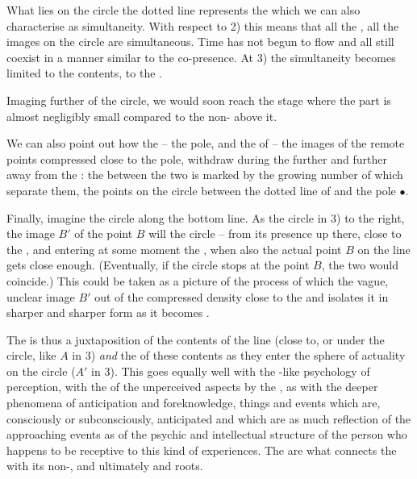 \noindent
What lies on the circle  the dotted line represents the
 which we can also characterise as simultaneity. With respect to
2) this means that all the , all the images on the circle are
simultaneous.  Time has not begun to flow and all  still
coexist in a manner similar to the  co-presence.  At 3) the
simultaneity becomes limited to the  contents, to the \hoa.

Imaging further  of the circle, we would soon reach the 
stage where the  part is almost negligibly small compared to the 
non- above it.

We can also point out how the  -- the pole, and the  
of  -- the 
 images of the remote points compressed close to the pole, withdraw during 
the  further and further away from the : the 
 between the two is marked by the growing number of  
which separate them, the points on the circle between the dotted line 
of  and the pole $\bullet$.

\pa\label{pa:density} Finally, imagine the circle  along the bottom
line.  As the circle in 3)  to the right, the image $B'$ of the point
$B$ will  the circle -- from its presence up there, close to the
, and entering at some moment the \hoa, when also the actual point
$B$ on the line gets close enough.  (Eventually, if the circle stops at the
point $B$, the two would coincide.)  This could be taken as a picture of the
process of  which  the vague, unclear image $B'$
out of the compressed density close to the  and isolates it in
sharper and sharper form as it becomes .

The  is thus a juxtaposition of the  contents
of the line (close to, or under the circle, like $A$ in 3) {\em and} the
 of these contents as they enter the sphere of actuality on the
circle  ($A'$ in 3). This goes equally well with the
-like psychology of perception, with the  of the
unperceived aspects by the , as with the deeper phenomena of
 anticipation and foreknowledge, things and events which are,
consciously or subconsciously, anticipated and which are as much reflection of
the approaching events as of the psychic and intellectual structure of the
person who happens to be receptive to this kind of experiences. The 
are what connects the  with its non-, and ultimately
 and  roots.

